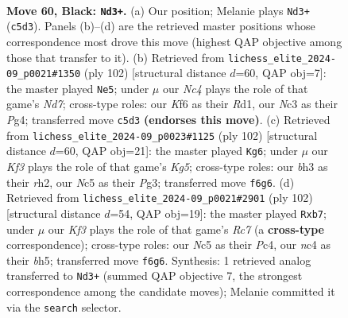 \documentclass[11pt]{article}
\begin{document}
\clearpage

\begin{figure}[p]\centering
\begin{subfigure}{0.46\textwidth}\centering
\resizebox{\linewidth}{!}{%
\newchessgame
\chessboard[
  setfen={8/Pb6/5k2/2n3N1/1pN2P2/1Pn3PB/5K1P/R7 b - - 2 60},
  showmover=false,
  pgfstyle=straightmove, color=movearrow, markmove={c5-d3}
]}
\caption{}
\end{subfigure}\hfill
\begin{subfigure}{0.46\textwidth}\centering
\resizebox{\linewidth}{!}{%
\newchessgame
\chessboard[
  setfen={7k/b2N3p/2r3p1/P7/1p4PP/3n1p2/8/3R1K2 w - - 0 52},
  showmover=false,
  pgfstyle=straightmove, color=movearrow, markmove={d7-e5}
]}
\caption{}
\end{subfigure}
\\[4pt]
\begin{subfigure}{0.46\textwidth}\centering
\resizebox{\linewidth}{!}{%
\newchessgame
\chessboard[
  setfen={6k1/8/4p3/p2n1pKp/2BBb3/1P4P1/7r/8 w - - 0 52},
  showmover=false,
  pgfstyle=straightmove, color=movearrow, markmove={g5-g6}
]}
\caption{}
\end{subfigure}\hfill
\begin{subfigure}{0.46\textwidth}\centering
\resizebox{\linewidth}{!}{%
\newchessgame
\chessboard[
  setfen={5r2/1nR5/2NpB1pk/3Pp2b/2P2p2/8/5K2/8 w - - 0 52},
  showmover=false,
  pgfstyle=straightmove, color=movearrow, markmove={c7-b7}
]}
\caption{}
\end{subfigure}
\caption{\textbf{Move 60, Black: \texttt{Nd3+}.} (a) Our position; Melanie plays \texttt{Nd3+} (\texttt{c5d3}). Panels (b)--(d) are the retrieved master positions whose correspondence most drove this move (highest QAP objective among those that transfer to it). (b) Retrieved from \texttt{lichess\_elite\_2024-09\_p0021\#1350} (ply 102) [structural distance $d$=60, QAP obj=7]: the master played \texttt{Ne5}; under $\mu$ our \emph{Nc4} plays the role of that game's \emph{Nd7}; cross-type roles: our \emph{K}f6 as their \emph{R}d1, our \emph{N}c3 as their \emph{P}g4; transferred move \texttt{c5d3} \textbf{(endorses this move)}. (c) Retrieved from \texttt{lichess\_elite\_2024-09\_p0023\#1125} (ply 102) [structural distance $d$=60, QAP obj=21]: the master played \texttt{Kg6}; under $\mu$ our \emph{Kf3} plays the role of that game's \emph{Kg5}; cross-type roles: our \emph{b}h3 as their \emph{r}h2, our \emph{N}c5 as their \emph{P}g3; transferred move \texttt{f6g6}. (d) Retrieved from \texttt{lichess\_elite\_2024-09\_p0021\#2901} (ply 102) [structural distance $d$=54, QAP obj=19]: the master played \texttt{Rxb7}; under $\mu$ our \emph{Kf3} plays the role of that game's \emph{Rc7} (a \textbf{cross-type} correspondence); cross-type roles: our \emph{N}c5 as their \emph{P}c4, our \emph{n}c4 as their \emph{b}h5; transferred move \texttt{f6g6}. Synthesis: 1 retrieved analog transferred to \texttt{Nd3+} (summed QAP objective 7, the strongest correspondence among the candidate moves); Melanie committed it via the \texttt{search} selector.}
\label{fig:thought-m119}
\end{figure}
\end{document}
